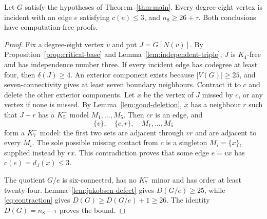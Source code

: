 \begin{proposition}\label{prop:critical-three-edge}
Let $G$ satisfy the hypotheses of Theorem~\ref{thm:main}.  Every
degree-eight vertex is incident with an edge $e$ satisfying $c(e)\leq3$,
and $n_8\geq26+\tau$.  Both conclusions have computation-free proofs.
\end{proposition}

\begin{proof}
Fix a degree-eight vertex $v$ and put $J=G[N(v)]$.  By
Proposition~\ref{prop:critical-base} and Lemma~\ref{lem:independent-triple},
$J$ is $K_4$-free and has independence number three.  If every incident
edge has codegree at least four, then $\delta(J)\geq4$.  An exterior
component exists because $|V(G)|\geq25$, and seven-connectivity gives at
least seven boundary neighbours.  Contract it to $c$ and delete the other
exterior components.  Let $x$ be the vertex of $J$ missed by $c$, or any
vertex if none is missed.  By Lemma~\ref{lem:good-deletion}, $x$ has a
neighbour $r$ such that $J-r$ has a $K_5^{-}$ model $M_1,\ldots,M_5$.
Then $cr$ is an edge, and
\[
                  \{v\},\quad\{c,r\},\quad M_1,\ldots,M_5
\]
form a $K_7^{-}$ model: the first two sets are adjacent through $vr$ and
are adjacent to every $M_i$.  The sole possible missing contact from $c$
is a singleton $M_i=\{x\}$, supplied instead by $rx$.  This contradiction
proves that some edge $e=vx$ has $c(e)=d_J(x)\leq3$.

The quotient $G/e$ is six-connected, has no $K_7^{-}$ minor and has order
at least twenty-four.  Lemma~\ref{lem:jakobsen-defect} gives $D(G/e)\geq25$,
while \eqref{eq:contraction} gives $D(G)\geq D(G/e)+1\geq26$.
The identity $D(G)=n_8-\tau$ proves the bound.
\end{proof}

